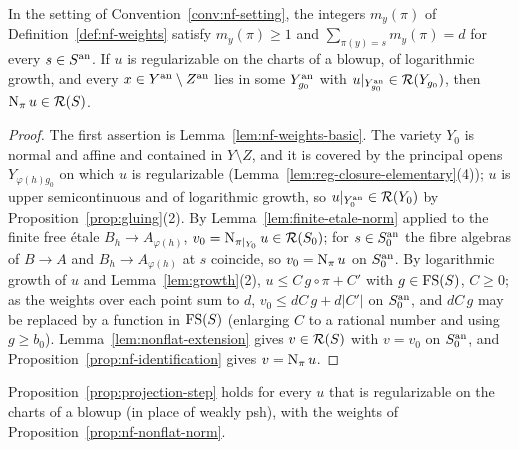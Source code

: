 \begin{proposition}\label{prop:nf-nonflat-norm}
\leanok
{}
In the setting of Convention~\ref{conv:nf-setting}, the integers $m_y(\pi)$ of Definition~\ref{def:nf-weights} satisfy
$m_y(\pi)\ge1$ and $\sum_{\pi(y)=s}m_y(\pi)=d$ for every $s\in S^{\mathrm{an}}$. If $u$ is regularizable on the charts of a blowup,
of logarithmic growth, and every $x\in Y^{\mathrm{an}}\setminus Z^{\mathrm{an}}$ lies in some $Y_{g_0}^{\mathrm{an}}$ with $u|_{Y_{g_0}^{\mathrm{an}}}\in\mathcal{R}(Y_{g_0})$,
then $\operatorname{N}_\pi u\in\mathcal{R}(S)$.
\end{proposition}

\begin{proof}
The first assertion is Lemma~\ref{lem:nf-weights-basic}. The variety $Y_0$ is normal and affine and contained in
$Y\setminus Z$, and it is covered by the principal opens $Y_{\varphi(h)g_0}$ on which $u$ is regularizable
(Lemma~\ref{lem:reg-closure-elementary}(4)); $u$ is upper semicontinuous and of logarithmic growth, so
$u|_{Y_0^{\mathrm{an}}}\in\mathcal{R}(Y_0)$ by Proposition~\ref{prop:gluing}(2). By Lemma~\ref{lem:finite-etale-norm} applied to the finite
free \'etale $B_h\to A_{\varphi(h)}$, $v_0=\operatorname{N}_{\pi|_{Y_0}}u\in\mathcal{R}(S_0)$; for $s\in S_0^{\mathrm{an}}$ the fibre algebras of
$B\to A$ and $B_h\to A_{\varphi(h)}$ at $s$ coincide, so $v_0=\operatorname{N}_\pi u$ on $S_0^{\mathrm{an}}$. By logarithmic growth of $u$ and
Lemma~\ref{lem:growth}(2), $u\le C\,g\circ\pi+C'$ with $g\in\mathrm{FS}(S)$, $C\ge0$; as the weights over each point sum to $d$,
$v_0\le dC\,g+d|C'|$ on $S_0^{\mathrm{an}}$, and $dC\,g$ may be replaced by a function in $\mathrm{FS}(S)$ (enlarging $C$ to a rational
number and using $g\ge b_0$). Lemma~\ref{lem:nonflat-extension} gives $v\in\mathcal{R}(S)$ with $v=v_0$ on $S_0^{\mathrm{an}}$, and
Proposition~\ref{prop:nf-identification} gives $v=\operatorname{N}_\pi u$.
\end{proof}

\begin{proposition}\label{prop:nf-projection-step}
\leanok
{}
Proposition~\ref{prop:projection-step} holds for every $u$ that is regularizable on the charts of a blowup (in place of
weakly psh), with the weights of Proposition~\ref{prop:nf-nonflat-norm}.
\end{proposition}

